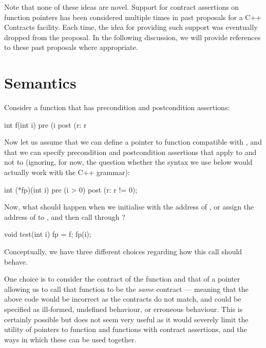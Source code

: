 Note that none of these ideas are novel. Support for contract assertions on function pointers has been considered multiple times in past proposals for a C++ Contracts facility. Each time, the idea for providing such support was eventually dropped from the proposal. In the following discussion, we will provide references to these past proposals where appropriate.

\section{Semantics}
Consider a function that has precondition and postcondition assertions:
\begin{codeblock}
int f(int i)
  pre (i %
  post (r: r %
\end{codeblock}
Now let us assume that we can define a pointer to function  compatible with , and that we can specify precondition and postcondition assertions that apply to  and not to  (ignoring, for now, the question whether the syntax we use below would actually work with the C++ grammar):
\begin{codeblock}
int (*fp)(int i) 
  pre (i > 0) 
  post (r: r != 0);
\end{codeblock}
Now, what should happen when we initialise  with the address of , or assign the address of  to , and then call  through ?
\begin{codeblock}  
void test(int i) {
  fp = f;    
  fp(i);
}
\end{codeblock}
Conceptually, we have three different choices regarding how this call should behave.

One choice is to consider the contract of the function and that of a pointer allowing us to call that function to be the \emph{same} contract --- meaning that the above code would be incorrect as the contracts do not match, and could be specified as ill-formed, undefined behaviour, or erroneous behaviour. This is certainly possible but does not seem very useful as it would severely limit the utility of pointers to function and functions with contract assertions, and the ways in which these can be used together.

